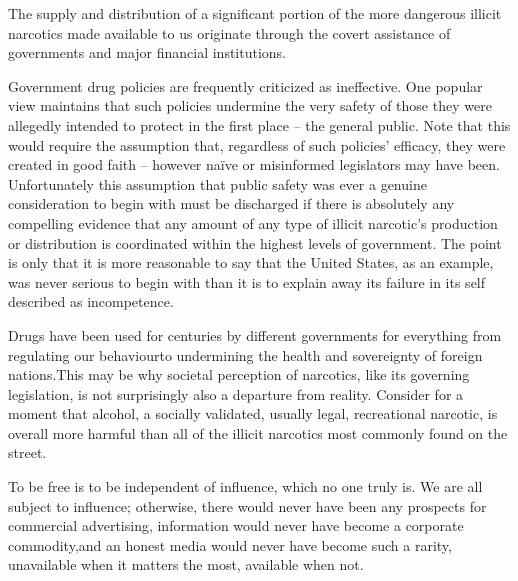 
The supply and distribution of a significant portion of the more dangerous illicit narcotics made available to us originate through the covert assistance of governments and major financial institutions.\footnotecite[webb1996] 

Government drug policies are frequently criticized as ineffective. One popular view maintains that such policies undermine the very safety of those they were allegedly intended to protect in the first place -- the general public. Note that this would require the assumption that, regardless of such policies' efficacy, they were created in good faith -- however naïve or misinformed legislators may have been. Unfortunately this assumption that public safety was ever a genuine consideration to begin with must be discharged if there is absolutely any compelling evidence that any amount of any type of illicit narcotic's production or distribution is coordinated within the highest levels of government. The point is only that it is more reasonable to say that the United States, as an example, was never serious to begin with than it is to explain away its failure in its self described  as incompetence. 

Drugs have been used for centuries by different governments for everything from regulating our behaviour to undermining the health and sovereignty of foreign nations. This may be why societal perception of narcotics, like its governing legislation, is not surprisingly also a departure from reality. Consider for a moment that alcohol, a socially validated, usually legal, recreational narcotic, is overall more harmful than all of the illicit narcotics most commonly found on the street.\footnotecite[extras={ See figure 2.}][nutt2010]


To be free is to be independent of influence, which no one truly is. We are all subject to influence; otherwise, there would never have been any prospects for commercial advertising, information would never have become a corporate commodity,\footnotecite[santoso2008]\footnotecite[nagata2011] and an honest media would never have become such a rarity, unavailable when it matters the most,
available when not.

